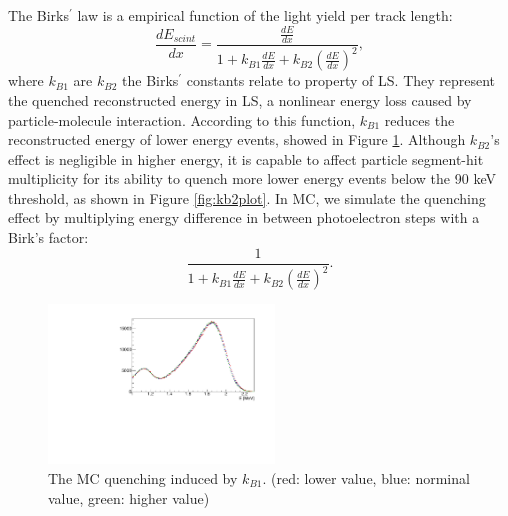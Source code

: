 The Birks$^\prime$ law is a empirical function of the light yield per track length:
\begin{equation}
    \frac{dE_{scint}}{dx} = \frac{\frac{dE}{dx}}{1+k_{B1}\frac{dE}{dx}+k_{B2}(\frac{dE}{dx})^2},
\end{equation}
where $k_{B1}$ are $k_{B2}$ the Birks$^\prime$ constants relate to property of LS. 
They represent the quenched reconstructed energy in LS, a nonlinear energy loss caused by particle-molecule interaction. 
According to this function, $k_{B1}$ reduces the reconstructed energy of lower energy events, showed in Figure \ref{fig:kb1plot}.
Although $k_{B2}$'s effect is negligible in higher energy, it is capable to affect particle segment-hit multiplicity for its ability to quench more lower energy events below the 90 keV threshold, as shown in Figure \ref{fig:kb2plot}.
In MC, we  simulate the quenching effect by multiplying energy difference in between photoelectron steps with a Birk's factor:
\begin{equation}
   \frac{1}{1+k_{B1}\frac{dE}{dx}+k_{B2}(\frac{dE}{dx})^2}.
   \label{eql:birks}
\end{equation}

\begin{figure}[h!]
\centering
\includegraphics[width=60mm]{Figures/kb1.pdf}
\caption{The MC quenching induced by $k_{B1}$. (red: lower value, blue: norminal value, green: higher value)}
\label{fig:kb1plot}
\end{figure}
 
